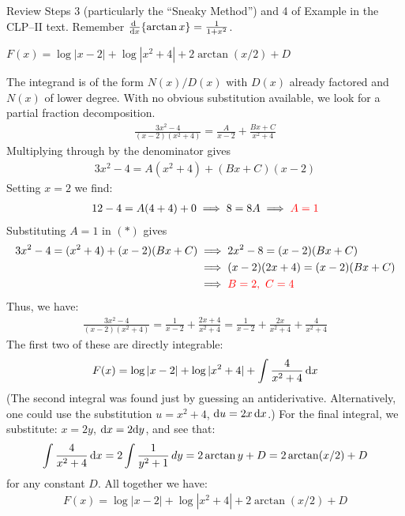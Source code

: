 \begin{hint}
Review Steps 3 (particularly the ``Sneaky Method'') and 4 of
Example 
in the %
CLP--II text. Remember $\diff{}{x}\{\arctan x\} = \frac{1}{1+x^2}$.
\end{hint}

\begin{answer}
$ F(x) = \log |x-2| + \log |x^2+4| + 2\arctan (x/2) + D$
\end{answer}

\begin{solution}
The integrand is of the form $N(x)/D(x)$ with $D(x)$ already factored
and $N(x)$ of lower degree. With no obvious substitution available, we look for a partial fraction decomposition.
\begin{align*}
\frac{3x^2 -4}{(x-2)(x^2+4)} = \frac{A}{x-2} + \frac{Bx + C}{x^2+4}
\end{align*}
Multiplying through by the denominator gives
\begin{align}
3x^2 -4 = A(x^2+4) + (Bx + C)(x-2)
\tag{$*$}
\end{align}
Setting $x=2$ we find:
\begin{align*}
   12 -4 = A(4 + 4) + 0 \implies 8 =8A  \implies \color{red}A = 1
\end{align*}
Substituting $A=1$ in $(*)$ gives
\begin{align*}
 3x^2 -4  = (x^2+4) + (x-2)(Bx + C)
  &\implies   2x^2-8 =(x-2)(Bx + C) \\
  &\implies   (x-2)(2x+4)=(x-2)(Bx + C) \\
  & \implies \color{red} B=2,~C=4
\end{align*}
Thus, we have:
\begin{align*}
 \frac{3x^2 -4}{(x-2)(x^2+4)} = \frac{1}{x-2} + \frac{2x + 4}{x^2+4} = \frac{1}{x-2} + \frac{2x }{x^2+4} + \frac{4}{x^2+4 }
\end{align*}
The first two of these are directly integrable:
\begin{align*}
  F(x) = \log |x-2| + \log |x^2+4| + \int \frac{4}{x^2+4}\,\mathrm{d}x
\end{align*}
(The second integral was found just by guessing an antiderivative.
Alternatively, one could use the substitution $u=x^2+4$, $\mathrm{d}u=2x\,\mathrm{d}x$.)
For the final integral, we substitute: $x = 2y$,
$\mathrm{d}x = 2\mathrm{d}y$, and see that:
\begin{align*}
  \int \frac{4}{x^2+4}\,\mathrm{d}x  = 2 \int \frac{1}{y^2 + 1}\,dy = 2 \arctan y + D = 2\arctan (x/2) + D
\end{align*}
for any constant $D$. All together we have:
\begin{align*}
   F(x) = \log |x-2| + \log |x^2+4| + 2\arctan (x/2) + D
\end{align*}
\end{solution}


